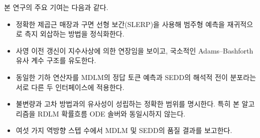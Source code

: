 본 연구의 주요 기여는 다음과 같다.
\begin{itemize}
  \item 정확한 제곱근 매장과 구면 선형 보간(SLERP)을 사용해 범주형 예측을 재귀적으로 측지
  외삽하는 방법을 정식화한다.
  \item 사영 이전 갱신이 지수사상에 의한 연장임을 보이고, 국소적인 Adams--Bashforth 유사 계수
  구조를 유도한다.
  \item 동일한 기하 연산자를 MDLM의 정답 토큰 예측과 SEDD의 해석적 전이 분포라는 서로 다른
  두 인터페이스에 적용한다.
  \item 불변량과 고차 방법과의 유사성이 성립하는 정확한 범위를 명시한다. 특히 본
  알고리즘을 RDLM 확률흐름 ODE 솔버와 동일시하지 않는다.
  \item 여섯 가지 역방향 스텝 수에서 MDLM 및 SEDD의 품질 결과를 보고한다.
\end{itemize}
